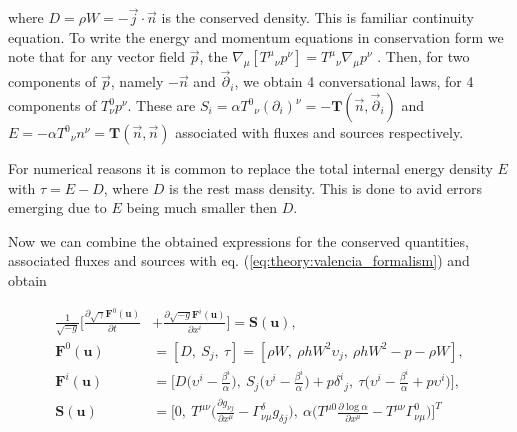 \documentclass[11pt,a4paper,headinclude=true,DIV=14,BCOR=8mm,chapterprefix,listof=totoc,twoside,openright,abstracton]{scrbook}
\begin{document}
where $D=\rho W = -\vec{j}\cdot \vec{n}$ is the conserved density. This is familiar continuity equation. To write the energy and momentum equations in conservation form we note that for any vector field $\vec{p}$, the $\nabla_{\mu}[{T^{\mu}}_{\nu}p^{\nu}] = {T^{\mu}}_{\nu} \nabla_{\mu} p^{\nu}$ 
\cite{Rezzolla:2013}. Then, for two components of $\vec{p}$, namely $-\vec{n}$ and $\vec{\partial}_i$, we obtain 4 conversational laws, for 4 components of $T^{0}_{\nu}p^{\nu}$. These are $S_{i} = \alpha {T^0}_{\nu}(\partial_i)^{\nu}=-\boldsymbol{T}(\vec{n},\vec{\partial}_i)$ and $E = -\alpha{T^0}_{\nu}n^{\nu} = \boldsymbol{T}(\vec{n},\vec{n})$ associated with fluxes and sources respectively. 

For numerical reasons it is common to replace the total internal energy density $E$ with $\tau = E-D$, where $D$ is the rest mass density. This is done to avid errors emerging due to $E$ being much smaller then $D$.

Now we can combine the obtained expressions for the conserved quantities, associated fluxes and sources with eq. (\ref{eq:theory:valencia_formalism}) and obtain

\begin{align}
     \frac{1}{\sqrt{-g}}\Big[\frac{\partial\sqrt{\gamma}\boldsymbol{F}^{0}(\boldsymbol{u})}{\partial t} &+ \frac{\partial\sqrt{-g}\boldsymbol{F}^{i}(\boldsymbol{u})}{\partial x^i}\Big] = \boldsymbol{S}(\boldsymbol{u}), \\
     \boldsymbol{F}^0(\boldsymbol{u}) &= [D,\: S_j,\: \tau] = [\rho W,\: \rho h W^2 \upsilon_j,\: \rho h W^2 - p - \rho W],\\
     \boldsymbol{F}^i(\boldsymbol{u}) &= \Bigg[D\Big(\upsilon^{i}-\frac{\beta^i}{\alpha}\Big),\: S_{j}\Big(\upsilon^{i}-\frac{\beta^i}{\alpha}\Big)+p{\delta^i}_j ,\: \tau\Big(\upsilon^{i}-\frac{\beta^i}{\alpha}+p\upsilon^i\Big)\Bigg],\\
     \boldsymbol{S}(\boldsymbol{u}) &= \Bigg[0,\: T^{\mu\nu}\Big(\frac{\partial g_{\nu j}}{\partial x^{\mu}} - \Gamma^{\delta}_{\nu\mu}g_{\delta j}\Big),\: \alpha\Big(T^{\mu 0}\frac{\partial\log\alpha}{\partial x^{\mu}}-T^{\mu\nu}\Gamma^{0}_{\nu\mu}\Big)\Bigg]^T
     \label{eq:theory:grhdvalencia}
\end{align}
\end{document}
